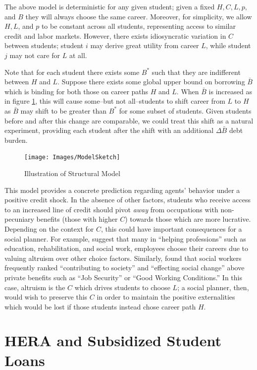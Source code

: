 \documentclass[12pt]{article}
\begin{document}
	The above model is deterministic for any given student; given a fixed $H, C, L, p,$ and $B$ they will always choose the same career. Moreover, for simplicity, we allow $H, L$, and $p$ to be constant across all students, representing access to similar credit and labor markets. However, there exists idiosyncratic variation in $C$ between students; student $i$ may derive great utility from career $L$, while student $j$ may not care for $L$ at all.

	Note that for each student there exists some $B^*$ such that they are indifferent between $H$ and $L$. Suppose there exists some global upper bound on borrowing $\bar{B}$ which is binding for both those on career paths $H$ and $L$. When $\bar{B}$ is increased as in figure \ref{struc}, this will cause some--but not all--students to shift career from $L$ to $H$ as $\bar{B}$ may shift to be greater than $B^*$ for some subset of students. Given students before and after this change are comparable, we could treat this shift as a natural experiment, providing each student after the shift with an additional $\Delta\bar{B}$ debt burden. 
	
		
	\begin{figure}
		\centering
		\caption{Illustration of Structural Model}
		\label{struc}
		\texttt{[image: Images/ModelSketch]}
	\end{figure}

	This model provides a concrete prediction regarding agents' behavior under a positive credit shock. In the absence of other factors, students who receive access to an increased line of credit should pivot \emph{away} from occupations with non-pecuniary benefits (those with higher $C$) towards those which are more lucrative. Depending on the context for $C$, this could have important consequences for a social planner. For example, \textcite{benshem1991} suggest that many in ``helping professions'' such as education, rehabilitation, and social work, employees choose their careers due to valuing altruism over other choice factors. Similarly, \textcite{hanson1995} found that social workers frequently ranked ``contributing to society'' and ``effecting social change'' above private benefits such as ``Job Security'' or ``Good Working Conditions.'' In this case, altruism is the $C$ which drives students to choose $L$; a social planner, then, would wish to preserve this $C$ in order to maintain the positive externalities which would be lost if those students instead chose career path $H$.

	\section{HERA and Subsidized Student Loans}
	
\end{document}
